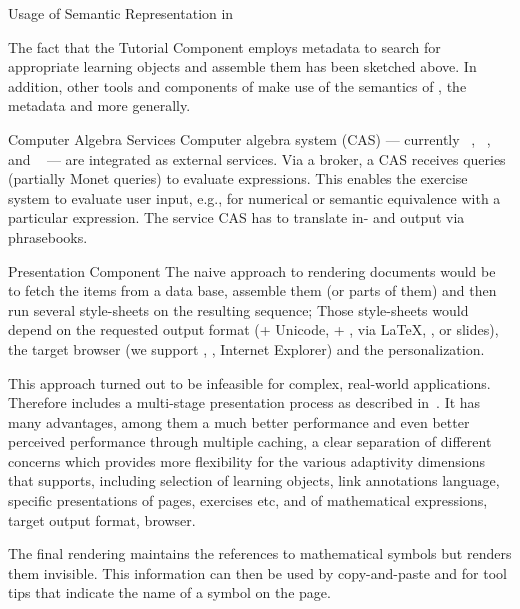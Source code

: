 \begin{omgroup}[id=activemath,short=ActiveMath,
  creators={melis,goguadse,alberto,frischauf,homik,libbrecht,cullrich}]
\begin{omgroup}{Usage of Semantic Representation in {\activemath}}

The fact that the Tutorial Component employs metadata to search for appropriate learning
objects and assemble them has been sketched above. In addition, other tools and components
of {\activemath} make use of the semantics of {\openmath}, the {\activemath} metadata and
{\omdoc} more generally.

\begin{omgroup}{Computer Algebra Services}
Computer algebra system (CAS) --- currently {}~\cite{URL:Yacas},
{}~\cite{URL:Maxima}, and {}~\cite{URL:wiris-cas} --- are
integrated as external services. Via a broker, a CAS receives queries (partially Monet
queries) to evaluate {\openmath} expressions. This enables the exercise system to evaluate
user input, e.g., for numerical or semantic equivalence with a particular
expression. The service CAS has to translate in- and output via phrasebooks.
\end{omgroup}

\begin{omgroup}{Presentation Component}
The naive approach to rendering {\omdoc} documents would be to fetch the items from a data
base, assemble them (or parts of them) and then run several style-sheets on the resulting
sequence; Those style-sheets would depend on the requested output format (\html + Unicode,
\xhtml + {\mathml}, {\pdf} via {\LaTeX}, {\svg}, or slides), the target browser (we
support {\mozilla}, {\firefox}, Internet Explorer) and the personalization.

This approach turned out to be infeasible for complex, real-world applications. Therefore
{\activemath} includes a multi-stage presentation process as described
in~\cite{Ullrichetal-Presentation-ICALT04}. It has many advantages, among them a much
better performance and even better perceived performance through multiple caching, a clear
separation of different concerns which provides more flexibility for the various
adaptivity dimensions that {\activemath} supports, including selection of learning
objects, link annotations language, specific presentations of pages, exercises etc, and of
mathematical expressions, target output format, browser.

The final rendering maintains the references to mathematical symbols but renders them
invisible. This information can then be used by copy-and-paste and for tool tips that
indicate the name of a symbol on the page.


\end{omgroup}
\end{omgroup}
\end{omgroup}
